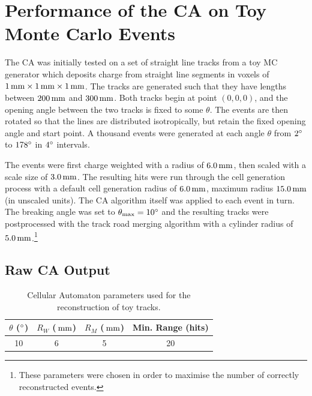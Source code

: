 \section{Performance of the \acl{CA} on Toy Monte Carlo Events}\label{sec:ca-toy-tracks}
The \ac{CA} was initially tested on a set of straight line tracks from a toy \ac{MC} generator which deposits charge from straight line segments in voxels of $1\,\mathrm{mm}\times1\,\mathrm{mm}\times1\,\mathrm{mm}$. The tracks are generated such that they have lengths between $200\,\mathrm{mm}$ and $300\,\mathrm{mm}$. Both tracks begin at point $(0, 0, 0)$, and the opening angle between the two tracks is fixed to some $\theta$. The events are then rotated so that the lines are distributed isotropically, but retain the fixed opening angle and start point. A thousand events were generated at each angle $\theta$ from $2^\circ$ to $178^\circ$ in $4^\circ$ intervals.

The events were first charge weighted with a radius of $6.0\,\mathrm{mm}$, then scaled with a scale size of $3.0\,\mathrm{mm}$. The resulting hits were run through the cell generation process with a default cell generation radius of $6.0\,\mathrm{mm}$, maximum radius $15.0\,\mathrm{mm}$ (in unscaled units). The \ac{CA} algorithm itself was applied to each event in turn. The breaking angle was set to $\theta_\mathrm{max} = 10^\circ$ and the resulting tracks were postprocessed with the track road merging algorithm with a cylinder radius of $5.0\,\mathrm{mm}$.\footnote{These parameters were chosen in order to maximise the number of correctly reconstructed events.}

\subsection{Raw \acl{CA} Output}
\begin{table}[h]
    \centering
    \begin{tabular}{cccc}
        $\theta$ ($^\circ$) & $R_W$ ($\,\mathrm{mm}$) & $R_M$ ($\,\mathrm{mm}$) & Min. Range (hits) \\
        \hline
        \hline
        10 & 6 & 5 & 20 \\
        \hline
    \end{tabular}
    \caption[CA parameter set for toy track processing]{\label{table:ca_params_toy_tracks}Cellular Automaton parameters used for the reconstruction of toy tracks.}
\end{table}

